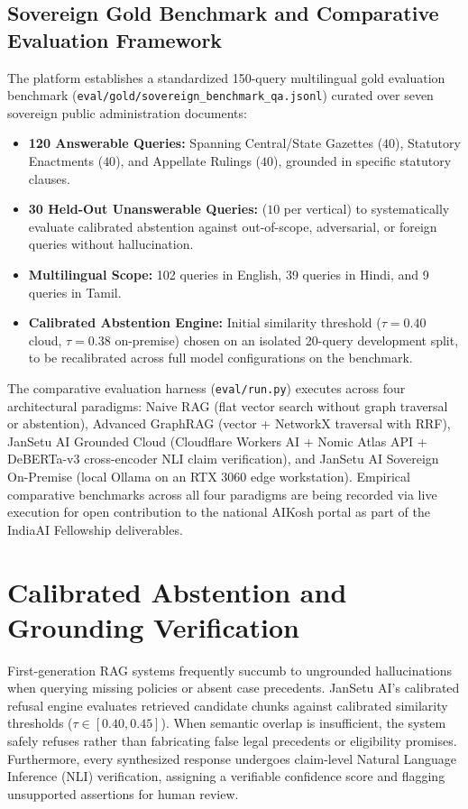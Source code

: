 \documentclass[12pt,a4paper,oneside]{report}
\begin{document}
\newpage

\subsection{Sovereign Gold Benchmark and Comparative Evaluation Framework}
The platform establishes a standardized 150-query multilingual gold evaluation benchmark (\texttt{eval/gold/sovereign\_benchmark\_qa.jsonl}) curated over seven sovereign public administration documents:
\begin{itemize}
    \item \textbf{120 Answerable Queries:} Spanning Central/State Gazettes ($40$), Statutory Enactments ($40$), and Appellate Rulings ($40$), grounded in specific statutory clauses.
    \item \textbf{30 Held-Out Unanswerable Queries:} ($10$ per vertical) to systematically evaluate calibrated abstention against out-of-scope, adversarial, or foreign queries without hallucination.
    \item \textbf{Multilingual Scope:} 102 queries in English, 39 queries in Hindi, and 9 queries in Tamil.
    \item \textbf{Calibrated Abstention Engine:} Initial similarity threshold ($\tau = 0.40$ cloud, $\tau = 0.38$ on-premise) chosen on an isolated 20-query development split, to be recalibrated across full model configurations on the benchmark.
\end{itemize}

The comparative evaluation harness (\texttt{eval/run.py}) executes across four architectural paradigms: Naive RAG (flat vector search without graph traversal or abstention), Advanced GraphRAG (vector + NetworkX traversal with RRF), JanSetu AI Grounded Cloud (Cloudflare Workers AI + Nomic Atlas API + DeBERTa-v3 cross-encoder NLI claim verification), and JanSetu AI Sovereign On-Premise (local Ollama on an RTX 3060 edge workstation). Empirical comparative benchmarks across all four paradigms are being recorded via live execution for open contribution to the national AIKosh portal as part of the IndiaAI Fellowship deliverables.

\section{Calibrated Abstention and Grounding Verification}
First-generation RAG systems frequently succumb to ungrounded hallucinations when querying missing policies or absent case precedents. JanSetu AI's calibrated refusal engine evaluates retrieved candidate chunks against calibrated similarity thresholds ($\tau \in [0.40, 0.45]$). When semantic overlap is insufficient, the system safely refuses rather than fabricating false legal precedents or eligibility promises. Furthermore, every synthesized response undergoes claim-level Natural Language Inference (NLI) verification, assigning a verifiable confidence score and flagging unsupported assertions for human review.
\end{document}
